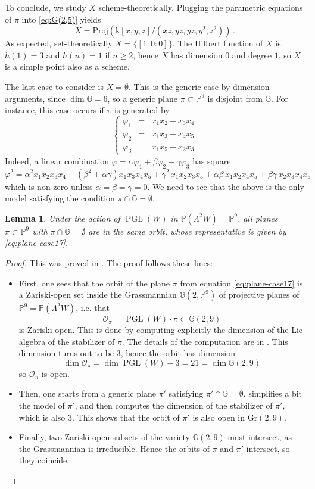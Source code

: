 \documentclass[10pt,reqno]{amsart}
\newcommand{\GG}{\mathbb{G}}
\newcommand{\PP}{\mathbb P}
\newcommand{\PGL}{\operatorname{PGL}}
\renewcommand{\a}{\alpha}
\renewcommand{\b}{\beta}
\newcommand{\g}{\gamma}
\newcommand{\f}{\varphi}
\renewcommand{\L}{\Lambda}
\newcommand{\kk}{\mathrm{k}}
\newtheorem{lemma}[theorem]{Lemma}
\theoremstyle{definition}
\begin{document}
\noindent To conclude, we study $X$ scheme-theoretically. Plugging the parametric equations of $\pi$ into \eqref{eq:G(2,5)} yields
\[
X=\mathrm{Proj}(\kk[x,y,z]/(xz,yz,yz,y^2,z^2))\,.
\]
As expected, set-theoretically $X=\{[1:0:0]\}$. The Hilbert function of $X$ is $h(1)=3$ and $h(n)=1$ if $n \ge 2$, hence $X$ has dimension $0$ and degree $1$, so $X$ is a simple point also as a scheme.

\noindent The last case to consider is $X=\emptyset$. This is the generic case by dimension arguments, since $\dim \GG=6$, so a generic plane $\pi \subset \PP^9$ is disjoint from $\GG$. 
For instance, this case occurs if $\pi$ is generated by
\begin{equation} \label{eq:plane-case17}
\left\{\begin{array}{ccl}
 \f_1 & = & x_1x_2+x_3x_4\\
 \f_2 & = & x_1x_3+x_4x_5\\
 \f_3 & = & x_1x_5+x_2x_3
\end{array}\right.
\end{equation}
Indeed, a linear combination $\f=\a \f_1+\b\f_2+\g\f_3$ has square
\[
\f^2=\a^2x_1x_2x_3x_4+(\b^2+\a\g)x_1x_3x_4x_5+ \g^2 \, x_1x_2x_3x_5 +\a\b \, x_1x_2x_4x_5+\b \g \, x_2x_3x_4x_5
\]
which is non-zero unless $\a=\b=\g=0$.
We need to see that the above is the only model satisfying the condition $\pi \cap \GG=\emptyset$. 

\begin{lemma}
Under the action of $\PGL(W)$ in $\PP(\L^2 W)=\PP^9$, all planes $\pi \subset \PP^9$ with $\pi \cap \GG=\emptyset$ are in the same orbit, whose representative is given by \eqref{eq:plane-case17}.
\end{lemma}
\begin{proof}
This was proved in \cite[Proposition 1]{Manivel-Mezzetti}. The proof follows these lines: 
\begin{itemize}
    \item First, one sees that the orbit of the plane $\pi$ from equation \eqref{eq:plane-case17} is a Zariski-open set inside the Grassmannian $\GG(2,\PP^9)$ of projective planes of $\PP^{9}=\PP(\L^2 W)$, i.e. that 
    \[
    \mathcal{O}_{\pi}=\PGL(W) \cdot \pi \subset \GG(2,9)
    \]
    is Zariski-open. This is done by computing explicitly the dimension of the Lie algebra of the stabilizer of $\pi$. The details of the computation are in \cite[Section 2]{Manivel-Mezzetti}. This dimension turns out to be $3$, hence the orbit has dimension 
    \[
    \dim \mathcal{O}_{\pi}= \dim \PGL(W)-3=21= \dim \GG(2,9)
    \]
    so $\mathcal{O}_{\pi}$ is open.
    \medskip
    \item Then, one starts from a generic plane $\pi'$ satisfying $\pi' \cap \GG=\emptyset$, simplifies a bit the model of $\pi'$, and then computes the dimension of the stabilizer of $\pi'$, which is also $3$. This shows that the orbit of $\pi'$ is also open in $\mathrm{Gr}(2,9)$.
    \medskip
    \item Finally, two Zariski-open subsets of the variety $\GG(2,9)$ must intersect, as the Grassmannian is irreducible. Hence the orbits of $\pi$ and $\pi'$ intersect, so they coincide.
\end{itemize}
\end{proof}
\end{document}
